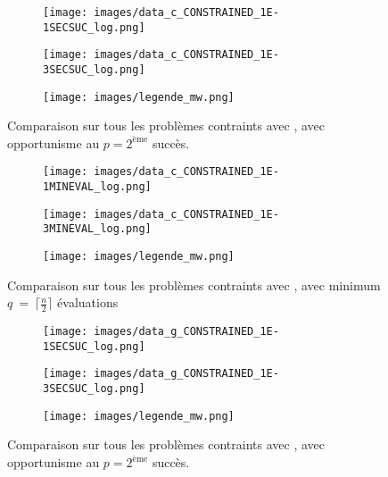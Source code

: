 \label{ann:A}
\begin{figure}[!htb]
	\centering
	\begin{subfigure}{0.43\textwidth}
		\texttt{[image: images/data\_c\_CONSTRAINED\_1E-1SECSUC\_log.png]}
	\end{subfigure}%
	\begin{subfigure}{0.43\textwidth}
		\texttt{[image: images/data\_c\_CONSTRAINED\_1E-3SECSUC\_log.png]}
	\end{subfigure}
	\smallskip
	\begin{subfigure}{0.95\textwidth}
		\texttt{[image: images/legende\_mw.png]}
	\end{subfigure}
	\caption{Comparaison sur tous les problèmes contraints avec \CS, avec opportunisme au $p=2^{\text{ème}}$ succès.}
	\label{fig:cs_const_secsuc}
\end{figure}
\begin{figure}[!htb]
	\centering
	\begin{subfigure}{0.43\textwidth}
		\texttt{[image: images/data\_c\_CONSTRAINED\_1E-1MINEVAL\_log.png]}
	\end{subfigure}%
	\begin{subfigure}{0.43\textwidth}
		\texttt{[image: images/data\_c\_CONSTRAINED\_1E-3MINEVAL\_log.png]}
	\end{subfigure}
	\smallskip
	\begin{subfigure}{0.95\textwidth}
		\texttt{[image: images/legende\_mw.png]}
	\end{subfigure}
	\caption{Comparaison sur tous les problèmes contraints avec \CS, avec minimum $q~=~\lceil\frac{n}{2}\rceil$ évaluations}
	\label{fig:cs_const_mineval}
\end{figure}
\begin{figure}[!htb]
	\centering
	\begin{subfigure}{0.43\textwidth}
		\texttt{[image: images/data\_g\_CONSTRAINED\_1E-1SECSUC\_log.png]}
	\end{subfigure}%
	\begin{subfigure}{0.43\textwidth}
		\texttt{[image: images/data\_g\_CONSTRAINED\_1E-3SECSUC\_log.png]}
	\end{subfigure}
	\smallskip
	\begin{subfigure}{0.95\textwidth}
		\texttt{[image: images/legende\_mw.png]}
	\end{subfigure}
	\caption{Comparaison sur tous les problèmes contraints avec \GPS, avec opportunisme au $p=2^{\text{ème}}$ succès.}
	\label{fig:gps_const_secsuc}
\end{figure}
